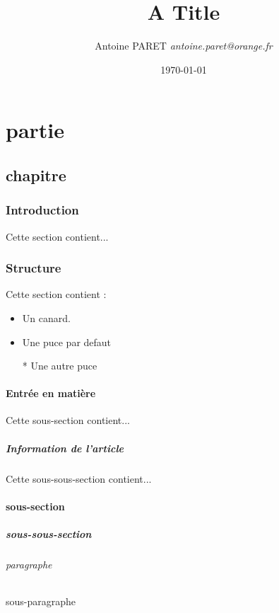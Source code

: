 \documentclass[a4paper]{report}
\begin{document}
\title{A Title}
\author{Antoine PARET
        \textit{antoine.paret@orange.fr}}
\date{\today}

\maketitle

\part{partie}
\chapter{chapitre}

    \section{Introduction}
Cette section contient...

    \section{Structure}
Cette section contient :

\begin{itemize}%

    \item Un canard.

    \item Une puce par defaut

    \item[*]Une autre puce

\end{itemize}

        \subsection{Entrée en matière}
Cette sous-section contient...

        \subsubsection{Information de l'article}
Cette sous-sous-section contient...

        \subsection{sous-section}
            \subsubsection{sous-sous-section}

\paragraph{paragraphe}
    \subparagraph{sous-paragraphe}
\end{document}
